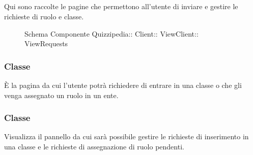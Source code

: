 \subsection{}
Qui sono raccolte le pagine che permettono all'utente di inviare e gestire le richieste di ruolo e classe.
\begin{figure}[H]
\centering
\noindent{}
\caption[Schema Componente ViewRequests]{Schema Componente Quizzipedia:: Client:: ViewClient:: ViewRequests}
\end{figure}
\subsubsection{Classe }
È la pagina da cui l'utente potrà richiedere di entrare in una classe o che gli venga assegnato un ruolo in un ente.
\begin{itemize}
\end{itemize}
\subsubsection{Classe }
Visualizza il pannello da cui sarà possibile gestire le richieste di inserimento in una classe e le richieste di assegnazione di ruolo pendenti.
\begin{itemize}
\end{itemize}
